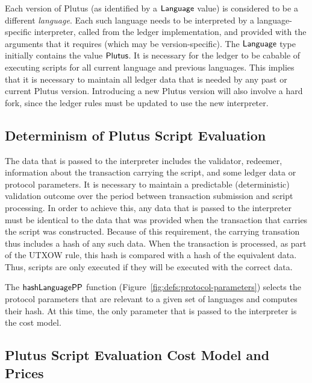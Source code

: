 Each version of Plutus (as identified by a $\mathsf{Language}$ value) is considered to be a different
\emph{language}.  Each such language needs to be interpreted by a language-specific interpreter, called from the ledger implementation,
and provided with the arguments that it requires (which may be version-specific).
The $\mathsf{Language}$ type initially contains the value $\mathsf{Plutus}$.
It is necessary for the ledger to be cabable of executing scripts for all current language and previous languages.
This implies that it is necessary to maintain all ledger
data that is needed by any past or current Plutus version. Introducing a new Plutus version will also
involve a hard fork, since the ledger rules must be updated to use the new interpreter.

\subsection{Determinism of Plutus Script Evaluation}
\label{sec:determinism}

The data that is passed to the interpreter
includes the validator, redeemer, information about the transaction carrying
the script, and some ledger data or protocol parameters.
It is necessary to maintain a predictable (deterministic) validation outcome over the period between transaction
submission and script processing.
%
In order to achieve this,
any data that is passed to the interpreter must be
identical to the data that was provided when the transaction that carries the script was
constructed.
Because of this requirement, the carrying transation thus includes a hash of any such data.
When the transaction is processed, as part of the UTXOW rule, this hash is compared with a hash of the equivalent data. Thus, scripts are only executed if they will be executed with the correct data.

The $\mathsf{hashLanguagePP}$ function (Figure~\ref{fig:defs:protocol-parameters}) selects the protocol parameters that are relevant to
a given set of languages and computes their hash.
%
At this time, the only parameter that is passed to the interpreter is the cost model.

\subsection{Plutus Script Evaluation Cost Model and Prices}
\label{sec:cost-mod}


